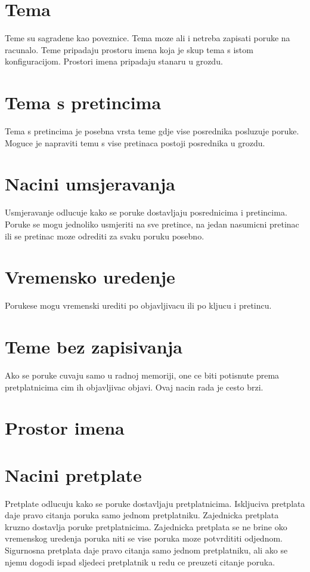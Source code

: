 \documentclass[times, utf8, diplomski, numeric]{fer}
\begin{document}
\chapter{Tema}
Teme su sagradene kao poveznice. Tema moze ali i netreba zapisati poruke na racunalo. Teme pripadaju prostoru imena koja je skup tema s istom konfiguracijom. Prostori imena pripadaju stanaru u grozdu. 

\chapter{Tema s pretincima}
Tema s pretincima je posebna vrsta teme gdje vise posrednika posluzuje poruke. Moguce je napraviti temu s vise pretinaca postoji posrednika u grozdu. 

\chapter{Nacini umsjeravanja}
Usmjeravanje odlucuje kako se poruke dostavljaju posrednicima i pretincima. Poruke se mogu jednoliko usmjeriti na sve pretince, na jedan nasumicni pretinac ili se pretinac moze odrediti za svaku poruku posebno. 

\chapter{Vremensko uredenje}
Porukese mogu vremenski urediti po objavljivacu ili po kljucu i pretincu.

\chapter{Teme bez zapisivanja}
Ako se poruke cuvaju samo u radnoj memoriji, one ce biti potisnute prema pretplatnicima cim ih objavljivac objavi. Ovaj nacin rada je cesto brzi.

\chapter{Prostor imena}

\chapter{Nacini pretplate}
Pretplate odlucuju kako se poruke dostavljaju pretplatnicima. Iskljuciva pretplata daje pravo citanja poruka samo jednom pretplatniku. Zajednicka pretplata kruzno dostavlja poruke pretplatnicima. Zajednicka pretplata se ne brine oko vremenskog uredenja poruka niti se vise poruka moze potvrdititi odjednom. Sigurnosna pretplata daje pravo citanja samo jednom pretplatniku, ali ako se njemu dogodi ispad sljedeci pretplatnik u redu ce preuzeti citanje poruka.
\end{document}
